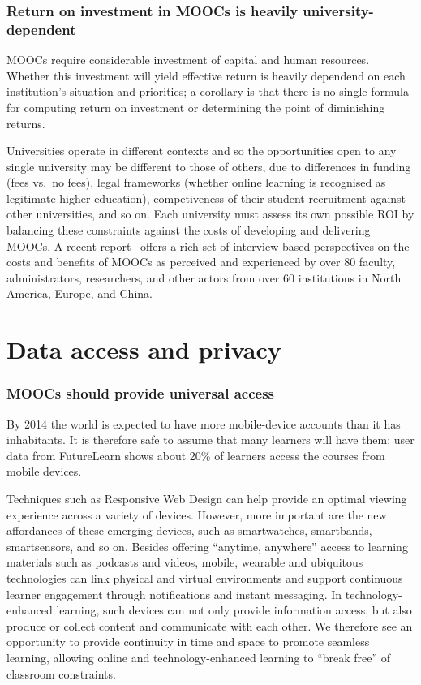 \documentclass[a4paper,UKenglish]{dagman}
\begin{document}
\subsubsection*{Return on investment in MOOCs is heavily university-dependent}

MOOCs require considerable investment of capital and human resources.  Whether this investment will
yield effective return is heavily dependend on each institution's situation and priorities; a
corollary is that there is no single formula for computing return on investment or determining the
point of diminishing returns.

Universities operate in different contexts and so the opportunities open to any single university
may be different to those of others, due to differences in funding (fees vs.\ no fees), legal
frameworks (whether online learning is recognised as legitimate higher education), competiveness of
their student recruitment against other universities, and so on.  Each university must assess its
own possible ROI by balancing these constraints against the costs of developing and delivering
MOOCs.  A recent report~\cite{moocs-expectations-and-reality} offers a rich set of interview-based
perspectives on the costs and benefits of MOOCs as perceived and experienced by over 80 faculty,
administrators, researchers, and other actors from over 60 institutions in North America, Europe,
and China.

\section{Data access and privacy}

\subsubsection*{MOOCs should provide universal access}
By 2014 the world is expected to have more mobile-device accounts than it has inhabitants.  It is
therefore safe to assume that many learners will have them: user data from FutureLearn shows about
20\% of learners access the courses from mobile devices. 

Techniques such as Responsive Web Design can help provide an optimal viewing experience across a
variety of devices.  However, more important are the new affordances of these emerging devices, such
as smartwatches, smartbands, smartsensors, and so on.  Besides offering ``anytime, anywhere'' access
to learning materials such as podcasts and videos, mobile, wearable and ubiquitous technologies can
link physical and virtual environments and support continuous learner engagement through
notifications and instant messaging. In technology-enhanced learning, such devices can not only
provide information access, but also produce or collect content and communicate with each other.  We
therefore see an opportunity to provide continuity in time and space to promote seamless learning,
allowing online and technology-enhanced learning to ``break free'' of classroom constraints.
\end{document}
